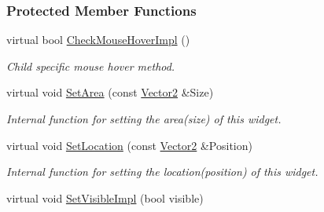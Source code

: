 \subsubsection*{Protected Member Functions}
\begin{DoxyCompactItemize}
\item 
\hypertarget{classMezzanine_1_1UI_1_1TabSet_a54ca252d5644b490f132b84c8ea2ad2d}{
virtual bool \hyperlink{classMezzanine_1_1UI_1_1TabSet_a54ca252d5644b490f132b84c8ea2ad2d}{CheckMouseHoverImpl} ()}
\label{classMezzanine_1_1UI_1_1TabSet_a54ca252d5644b490f132b84c8ea2ad2d}

\begin{DoxyCompactList}\small\item\em Child specific mouse hover method. \item\end{DoxyCompactList}\item 
\hypertarget{classMezzanine_1_1UI_1_1TabSet_a16d66ab0fc9fdd14e399f5c7e734b164}{
virtual void \hyperlink{classMezzanine_1_1UI_1_1TabSet_a16d66ab0fc9fdd14e399f5c7e734b164}{SetArea} (const \hyperlink{classMezzanine_1_1Vector2}{Vector2} \&Size)}
\label{classMezzanine_1_1UI_1_1TabSet_a16d66ab0fc9fdd14e399f5c7e734b164}

\begin{DoxyCompactList}\small\item\em Internal function for setting the area(size) of this widget. \item\end{DoxyCompactList}\item 
\hypertarget{classMezzanine_1_1UI_1_1TabSet_a2fa3c2bd99febadee512ec6eca9a1a42}{
virtual void \hyperlink{classMezzanine_1_1UI_1_1TabSet_a2fa3c2bd99febadee512ec6eca9a1a42}{SetLocation} (const \hyperlink{classMezzanine_1_1Vector2}{Vector2} \&Position)}
\label{classMezzanine_1_1UI_1_1TabSet_a2fa3c2bd99febadee512ec6eca9a1a42}

\begin{DoxyCompactList}\small\item\em Internal function for setting the location(position) of this widget. \item\end{DoxyCompactList}\item 
\hypertarget{classMezzanine_1_1UI_1_1TabSet_a7b1e2da42649734fa735e6675a7570c3}{
virtual void \hyperlink{classMezzanine_1_1UI_1_1TabSet_a7b1e2da42649734fa735e6675a7570c3}{SetVisibleImpl} (bool visible)}
\label{classMezzanine_1_1UI_1_1TabSet_a7b1e2da42649734fa735e6675a7570c3}


\end{DoxyCompactItemize}

